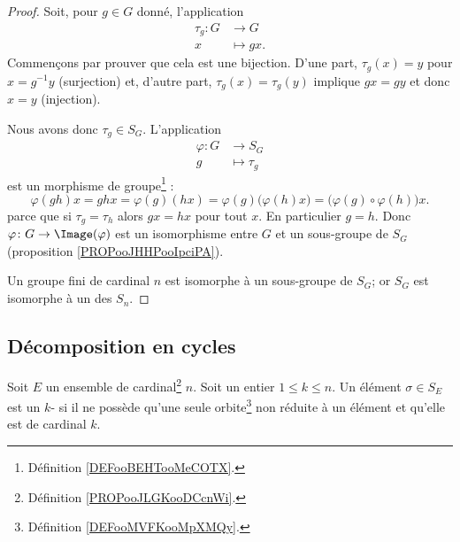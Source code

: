 \begin{proof}
	Soit, pour \( g\in G\) donné, l'application
	\begin{equation}
		\begin{aligned}
			\tau_g\colon G & \to G       \\
			x              & \mapsto gx.
		\end{aligned}
	\end{equation}
	Commençons par prouver que cela est une bijection.  D'une part, \( \tau_g(x)=y\) pour \( x=g^{-1} y\) (surjection) et, d'autre part, \( \tau_g(x)=\tau_g(y)\) implique \( gx=gy\) et donc \( x=y\) (injection).

	Nous avons donc \( \tau_g\in S_G\). L'application
	\begin{equation}
		\begin{aligned}
			\varphi\colon G & \to S_G        \\
			g               & \mapsto \tau_g
		\end{aligned}
	\end{equation}
	est un morphisme de groupe\footnote{Définition \ref{DEFooBEHTooMeCOTX}.} :
	\begin{equation}
		\varphi(gh)x=ghx=\varphi(g)(hx)=\varphi(g)\Big( \varphi(h)x \Big)=\Big( \varphi(g)\circ \varphi(h) \Big)x.
	\end{equation}
	 parce que si \( \tau_g=\tau_h\) alors \( gx=hx\) pour tout \( x\). En particulier \( g=h\). Donc \( \varphi\colon G\to \Image(\varphi)\) est un isomorphisme entre \( G\) et un sous-groupe de \( S_G\) (proposition \ref{PROPooJHHPooIpciPA}).

	Un groupe fini de cardinal \( n\) est isomorphe à un sous-groupe de \( S_G\); or \( S_G\) est isomorphe à un des \( S_n\).
\end{proof}


\subsection{Décomposition en cycles}

\begin{definition}		\label{DEFooRWYSooYmKwph}
	Soit \( E\) un ensemble de cardinal\footnote{Définition \ref{PROPooJLGKooDCcnWi}.} \( n\). Soit un entier \( 1\leq k\leq n\). Un élément \( \sigma\in S_E\) est un \( k\)- si il ne possède qu'une seule orbite\footnote{Définition \ref{DEFooMVFKooMpXMQy}.} non réduite à un élément et qu'elle est de cardinal \( k\).
\end{definition}

